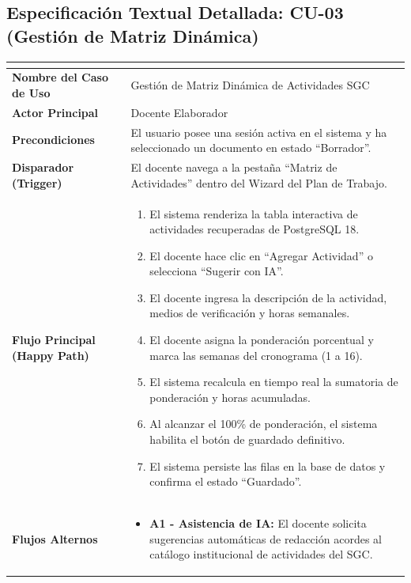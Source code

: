 \documentclass[12pt,a4paper]{article}
\begin{document}
\subsection{Especificación Textual Detallada: CU-03 (Gestión de Matriz Dinámica)}
\begin{table}[H]
\centering
\small
\renewcommand{\arraystretch}{1.15}
\begin{tabularx}{\textwidth}{|>{\hsize=0.7\hsize\raggedright\arraybackslash\bfseries\footnotesize}X|>{\hsize=1.3\hsize\raggedright\arraybackslash\footnotesize}X|}
\hline
\rowcolor{tableheader}
\multicolumn{2}{|c|}{\textbf{FORMATO OFICIAL DE ESPECIFICACIÓN DE CASO DE USO -- CU-03}} \\
\hline
Nombre del Caso de Uso & Gestión de Matriz Dinámica de Actividades SGC \\
\hline
Actor Principal & Docente Elaborador \\
\hline
Precondiciones & El usuario posee una sesión activa en el sistema y ha seleccionado un documento en estado ``Borrador''. \\
\hline
Disparador (Trigger) & El docente navega a la pestaña ``Matriz de Actividades'' dentro del Wizard del Plan de Trabajo. \\
\hline
Flujo Principal (Happy Path) & 
\begin{enumerate}[leftmargin=1.2em, itemsep=1pt]
    \item El sistema renderiza la tabla interactiva de actividades recuperadas de PostgreSQL 18.
    \item El docente hace clic en ``Agregar Actividad'' o selecciona ``Sugerir con IA''.
    \item El docente ingresa la descripción de la actividad, medios de verificación y horas semanales.
    \item El docente asigna la ponderación porcentual y marca las semanas del cronograma (1 a 16).
    \item El sistema recalcula en tiempo real la sumatoria de ponderación y horas acumuladas.
    \item Al alcanzar el 100\% de ponderación, el sistema habilita el botón de guardado definitivo.
    \item El sistema persiste las filas en la base de datos y confirma el estado ``Guardado''.
\end{enumerate} \\
\hline
Flujos Alternos & 
\begin{itemize}[leftmargin=1.2em, itemsep=1pt]
    \item \textbf{A1 - Asistencia de IA:} El docente solicita sugerencias automáticas de redacción acordes al catálogo institucional de actividades del SGC.

\end{itemize}
\end{tabularx}
\end{table}
\end{document}
